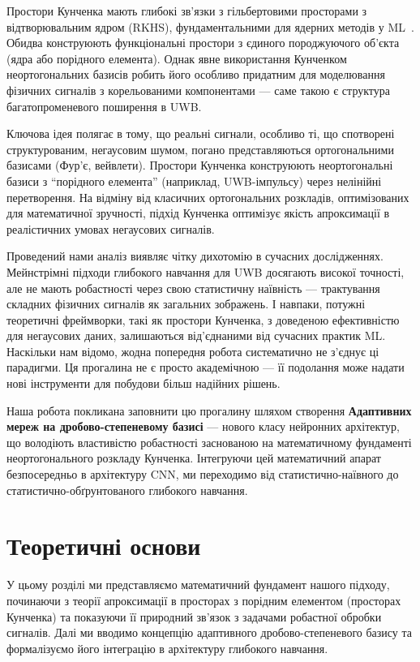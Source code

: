 \documentclass[12pt,a4paper]{article}
\begin{document}
Простори Кунченка мають глибокі зв'язки з гільбертовими просторами з відтворювальним ядром (RKHS), фундаментальними для ядерних методів у ML~\cite{berlinet2004reproducing}. Обидва конструюють функціональні простори з єдиного породжуючого об'єкта (ядра або порідного елемента). Однак явне використання Кунченком неортогональних базисів робить його особливо придатним для моделювання фізичних сигналів з корельованими компонентами --- саме такою є структура багатопроменевого поширення в UWB.

Ключова ідея полягає в тому, що реальні сигнали, особливо ті, що спотворені структурованим, негаусовим шумом, погано представляються ортогональними базисами (Фур'є, вейвлети). Простори Кунченка конструюють неортогональні базиси з ``порідного елемента'' (наприклад, UWB-імпульсу) через нелінійні перетворення. На відміну від класичних ортогональних розкладів, оптимізованих для математичної зручності, підхід Кунченка оптимізує якість апроксимації в реалістичних умовах негаусових сигналів.

Проведений нами аналіз виявляє чітку дихотомію в сучасних дослідженнях. Мейнстрімні підходи глибокого навчання для UWB досягають високої точності, але не мають робастності через свою статистичну наївність --- трактування складних фізичних сигналів як загальних зображень. І навпаки, потужні теоретичні фреймворки, такі як простори Кунченка, з доведеною ефективністю для негаусових даних, залишаються від'єднаними від сучасних практик ML. Наскільки нам відомо, жодна попередня робота систематично не з'єднує ці парадигми. Ця прогалина не є просто академічною --- її подолання може надати нові інструменти для побудови більш надійних рішень.

Наша робота покликана заповнити цю прогалину шляхом створення \textbf{Адаптивних мереж на дробово-степеневому базисі} --- нового класу нейронних архітектур, що володіють властивістю робастності заснованою на математичному фундаменті неортогонального розкладу Кунченка. Інтегруючи цей математичний апарат безпосередньо в архітектуру CNN, ми переходимо від статистично-наївного до статистично-обґрунтованого глибокого навчання.
	
\section{Теоретичні основи}
\label{sec:theory}

У цьому розділі ми представляємо математичний фундамент нашого підходу, починаючи з теорії апроксимації в просторах з порідним елементом (просторах Кунченка) та показуючи її природний зв'язок з задачами робастної обробки сигналів. Далі ми вводимо концепцію адаптивного дробово-степеневого базису та формалізуємо його інтеграцію в архітектуру глибокого навчання.
\end{document}
